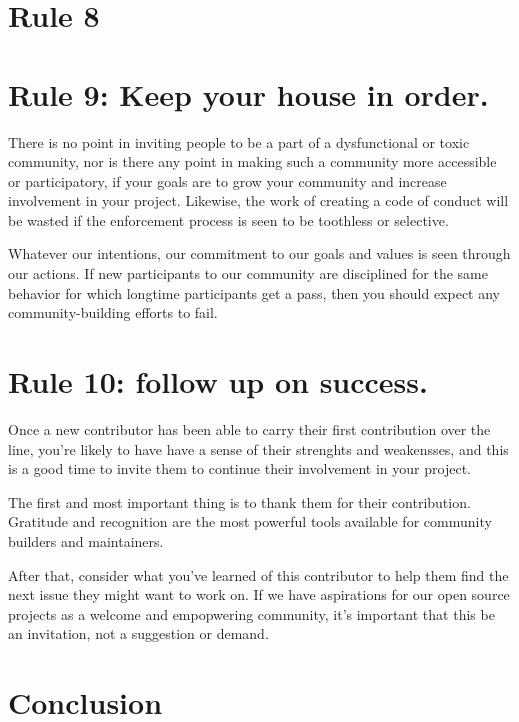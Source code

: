 \documentclass[10pt,letterpaper]{article}
\newcommand{\rulemajor}[1]{\section{#1}}
\begin{document}
\rulemajor{Rule 8}

\rulemajor{Rule 9: Keep your house in order.}

There is no point in inviting people to be a part of a dysfunctional or toxic community,
nor is there any point in making such a community more accessible or participatory,
if your goals are to grow your community and increase involvement in your project.
Likewise,
the work of creating a code of conduct will be wasted
if the enforcement process is seen to be toothless or selective.

Whatever our intentions,
our commitment to our goals and values is seen through our actions.
If new participants to our community are disciplined for the same behavior
for which longtime participants get a pass,
then you should expect any community-building efforts to fail.

\rulemajor{Rule 10: follow up on success.}

Once a new contributor has been able to carry their first contribution over the line, 
you're likely to have have a sense of their strenghts and weakensses,
and this is a good time to invite them to continue their involvement in your project.

The first and most important thing is to thank them for their contribution.
Gratitude and recognition are the most powerful tools available for community builders and maintainers. 

After that,
consider what you've learned of this contributor to help them find
the next issue they might want to work on.
If we have aspirations for our open source projects as a welcome and empopwering community,
it's important that this be an invitation,
not a suggestion or demand. 

\section*{Conclusion}


\end{document}
